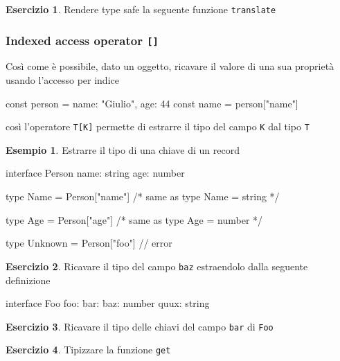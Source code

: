 \documentclass[12pt]{article}
\theoremstyle{definition}
\newtheorem{example}{Esempio}[subsection]
\newtheorem{exercise}{Esercizio}[subsection]
\newenvironment{code}
  {\vspace{0.5cm} \VerbatimEnvironment\begin{typescriptcode}}
  {\end{typescriptcode} \vspace{0.2cm}}
\begin{document}
\begin{exercise}
Rendere type safe la seguente funzione \texttt{translate}
\end{exercise}

\subsubsection{Indexed access operator \texttt{[]}}

Così come è possibile, dato un oggetto, ricavare il valore di una sua proprietà usando l'accesso per indice

\begin{code}
const person = { name: "Giulio", age: 44 }
const name = person["name"]
\end{code}

così l'operatore \texttt{T[K]} permette di estrarre il tipo del campo \texttt{K} dal tipo \texttt{T}

\begin{example}
Estrarre il tipo di una chiave di un record

\begin{code}
interface Person {
  name: string
  age: number
}

type Name = Person["name"]
/* same as
type Name = string
*/

type Age = Person["age"]
/* same as
type Age = number
*/

type Unknown = Person["foo"] // error
\end{code}
\end{example}

\begin{exercise}
Ricavare il tipo del campo \texttt{baz} estraendolo dalla seguente definizione

\begin{code}
interface Foo {
  foo: {
    bar: {
      baz: number
      quux: string
    }
  }
}
\end{code}
\end{exercise}

\begin{exercise}
Ricavare il tipo delle chiavi del campo \texttt{bar} di \texttt{Foo}
\end{exercise}

\begin{exercise}
Tipizzare la funzione \texttt{get}
\end{exercise}
\end{document}
